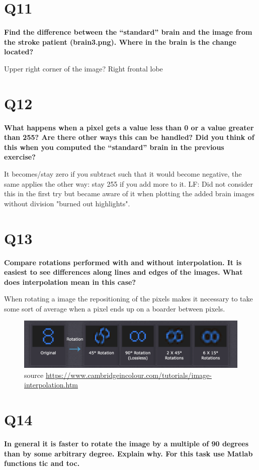 \documentclass[oneside,a4paper]{article}
\begin{document}
\section{Q11}
\textbf{Find the difference between the “standard” brain and the image from the stroke patient
(brain3.png). Where in the brain is the change located?}

Upper right corner of the image? Right frontal lobe




\section*{Q12}
\textbf{What happens when a pixel gets a value less than 0 or a value greater than 255? Are there other ways this can be handled? Did you think of this when you computed the “standard” brain in the previous exercise?}

It becomes/stay zero if you subtract such that it would become negative, the same applies the other way: stay 255 if you add more to it. LF: Did not consider this in the first try but became aware of it when plotting the added brain images without division "burned out highlights". 


\section*{Q13}
\textbf{Compare rotations performed with and without interpolation. It is easiest to see differences along lines and edges of the images. What does interpolation mean in this case?}

When rotating a image the repositioning of the pixels makes it necessary to take some sort of average when a pixel ends up on a boarder between pixels. 

\begin{figure}[ht!]
\centering
\includegraphics[width=120mm]{figures/Screenshot 2022-11-03 at 19.35.40.png}
\caption{source \url{https://www.cambridgeincolour.com/tutorials/image-interpolation.htm}}
\label{fig:example}
\end{figure}

\section*{Q14}
\textbf{In general it is faster to rotate the image by a multiple of 90 degrees than by some arbitrary degree. Explain why. For this task use Matlab functions tic and toc.}
\end{document}
